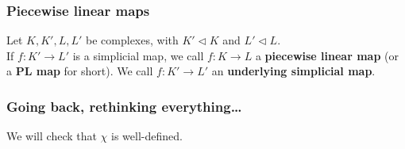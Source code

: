\documentclass[14pt]{beamer}
\newcommand{\subdivided}{\triangleleft}
\begin{document}
\begin{frame}
\frametitle{Piecewise linear maps}

\begin{definition}
  Let $K, K', L, L'$ be complexes, with $K' \subdivided K$ and $L'
  \subdivided L$.  \\
  If $f : K' \to L'$ is a simplicial map, we call $f
  : K \to L$ a \textbf{piecewise linear map} (or a \textbf{PL map}
  for short).  We call $f : K' \to L'$ an \textbf{underlying
    simplicial map}.
\end{definition}



\end{frame}




\begin{frame}
\frametitle{Going back, rethinking everything\ldots}

\begin{center}
\scalebox{2}{Are $S^2$ and $T^2$ the same?}
\end{center}

\pause
We will check that $\chi$ is well-defined.
\end{frame}
\end{document}
